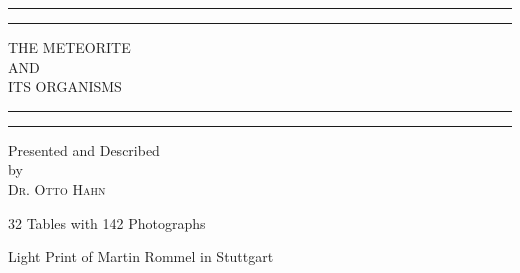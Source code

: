 \documentclass[a4paper, 11pt, oneside]{article}
\begin{document}
\begin{titlepage} %
	\centering %
	\scshape %
	\vspace*{\baselineskip} %
	
	
	\rule{\textwidth}{1.6pt}\vspace*{-\baselineskip}\vspace*{2pt} %
	\rule{\textwidth}{0.4pt} %
	
	\vspace{0.75\baselineskip} %
	
	{\LARGE THE METEORITE\\ AND\\ ITS ORGANISMS\\} %
	
	\vspace{0.75\baselineskip} %
	
	\rule{\textwidth}{0.4pt}\vspace*{-\baselineskip}\vspace{3.2pt} %
	\rule{\textwidth}{1.6pt} %
	
	\vspace{1\baselineskip} %
	
	
	{Presented and Described\\ by\\ \scshape\Large Dr. Otto Hahn\\} %
	
	\vspace*{1\baselineskip} %
	
    {\small 32 Tables with 142 Photographs} %
	
    {\small Light Print of Martin Rommel in Stuttgart} %
	
	

\end{titlepage}
\end{document}
